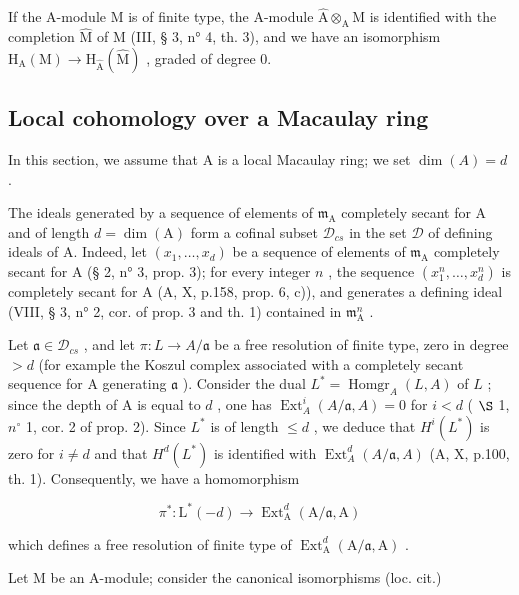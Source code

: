 If the A-module M is of finite type, the A-module \(\widehat{\mathrm{A}}\otimes_{\mathrm{A}}\mathrm{M}\) is identified with the completion \(\widehat{\mathrm{M}}\) of M (III, § 3, n° 4, th. 3), and we have an isomorphism \(\mathrm{H}_{\mathrm{A}}(\mathrm{M})\to \mathrm{H}_{\widehat{\mathrm{A}}}(\widehat{\mathrm{M}})\) , graded of degree 0.

\subsection{Local cohomology over a Macaulay ring}

In this section, we assume that A is a local Macaulay ring; we set \(\dim(A) = d\) .

The ideals generated by a sequence of elements of \(\mathfrak{m}_{\mathrm{A}}\) completely secant for A and of length \(d = \dim (\mathrm{A})\) form a cofinal subset \(\mathcal{D}_{cs}\) in the set \(\mathcal{D}\) of defining ideals of A. Indeed, let \((x_{1},\ldots ,x_{d})\) be a sequence of elements of \(\mathfrak{m}_{\mathrm{A}}\) completely secant for A (§ 2, n° 3, prop. 3); for every integer \(n\) , the sequence \((x_1^n,\dots ,x_d^n)\) is completely secant for A (A, X, p.158, prop. 6, c)), and generates a defining ideal (VIII, § 3, n° 2, cor. of prop. 3 and th. 1) contained in \(\mathfrak{m}_{\mathrm{A}}^n\) .

Let \(\mathfrak{a} \in \mathcal{D}_{cs}\) , and let \(\pi: L \to A/\mathfrak{a}\) be a free resolution of finite type, zero in degree \(>d\) (for example the Koszul complex associated with a completely secant sequence for A generating \(\mathfrak{a}\) ). Consider the dual \(L^{*} = \operatorname{Homgr}_{A}(L,A)\) of \(L\) ; since the depth of A is equal to \(d\) , one has \(\operatorname{Ext}_{A}^{i}(A/\mathfrak{a}, A) = 0\) for \(i < d\) ( \(\S\) 1, \(n^{\circ}\) 1, cor. 2 of prop. 2). Since \(L^{*}\) is of length \(\leqslant d\) , we deduce that \(H^{i}(L^{*})\) is zero for \(i \neq d\) and that \(H^{d}(L^{*})\) is identified with \(\operatorname{Ext}_{A}^{d}(A/\mathfrak{a}, A)\) (A, X, p.100, th. 1). Consequently, we have a homomorphism

\[
\pi^ {*}: \mathrm{L} ^ {*} (- d) \longrightarrow \operatorname{Ext} _ {\mathrm{A}} ^ {d} (\mathrm{A} / \mathfrak {a}, \mathrm{A})
\]

which defines a free resolution of finite type of \(\operatorname{Ext}_{\mathrm{A}}^{d}(\mathrm{A}/\mathfrak{a},\mathrm{A})\) .

Let M be an A-module; consider the canonical isomorphisms (loc. cit.)


